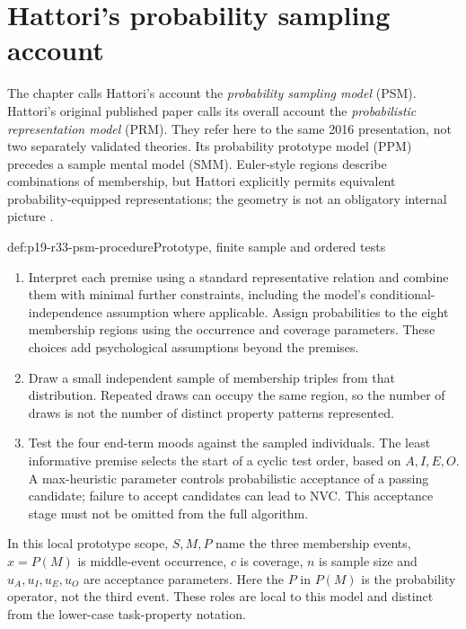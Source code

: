 \section{Hattori's probability sampling account}
\label{sec:p19-r33-psm}

The chapter calls Hattori's account the \emph{probability sampling model}
(PSM). Hattori's original published paper calls its overall account the
\emph{probabilistic representation model} (PRM). They refer here to the
same 2016 presentation, not two separately validated theories. Its
probability prototype model (PPM) precedes a sample mental model (SMM).
Euler-style regions describe combinations of membership, but Hattori
explicitly permits equivalent probability-equipped representations; the
geometry is not an obligatory internal picture
\cite[pp.~229--231]{Khemlani2021Syllogistic}
\cite[pp.~300--304]{Hattori2016PRM}.

\begin{hbmethod}{def:p19-r33-psm-procedure}{Prototype, finite sample and ordered tests}
\begin{enumerate}
\item Interpret each premise using a standard representative relation and
combine them with minimal further constraints, including the model's
conditional-independence assumption where applicable. Assign probabilities
to the eight membership regions using the occurrence and coverage
parameters. These choices add psychological assumptions beyond the premises.
\item Draw a small independent sample of membership triples from that
distribution. Repeated draws can occupy the same region, so the number
of draws is not the number of distinct property patterns represented.
\item Test the four end-term moods against the sampled individuals. The
least informative premise selects the start of a cyclic test order, based
on \(A,I,E,O\). A max-heuristic parameter controls probabilistic
acceptance of a passing candidate; failure to accept candidates can lead
to NVC. This acceptance stage must not be omitted from the full algorithm.
\end{enumerate}
In this local prototype scope, \(S,M,P\) name the three membership
events, \(x=P(M)\) is middle-event occurrence, \(c\) is coverage,
\(n\) is sample size and \(u_A,u_I,u_E,u_O\) are acceptance
parameters. Here the \(P\) in \(P(M)\) is the probability operator,
not the third event. These roles are local to this model and distinct
from the lower-case task-property notation.
\end{hbmethod}

